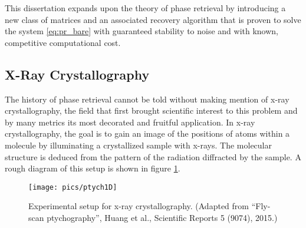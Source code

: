 This dissertation expands upon the theory of phase retrieval by introducing a new class of matrices and an associated recovery algorithm that is proven to solve the system \eqref{eq:pr_bare} with guaranteed stability to noise and with known, competitive computational cost.

\subsection{X-Ray Crystallography}
\label{sec:crystallography}
The history of phase retrieval cannot be told without making mention of x-ray crystallography, the field that first brought scientific interest to this problem and by many metrics its most decorated and fruitful application.  In x-ray crystallography, the goal is to gain an image of the positions of atoms within a molecule by illuminating a crystallized sample with x-rays.  The molecular structure is deduced from the pattern of the radiation diffracted by the sample.  A rough diagram of this setup is shown in figure \ref{fig:xray_cryst}.

\begin{figure}
  \centering\texttt{[image: pics/ptych1D]}
  \caption[Experimental setup for x-ray crystallography]
          {Experimental setup for x-ray crystallography.   {\small
              (Adapted from ``Fly-scan ptychography'', Huang et al.,
              Scientific Reports 5 (9074), 2015.)}}
  \label{fig:xray_cryst}
\end{figure}

